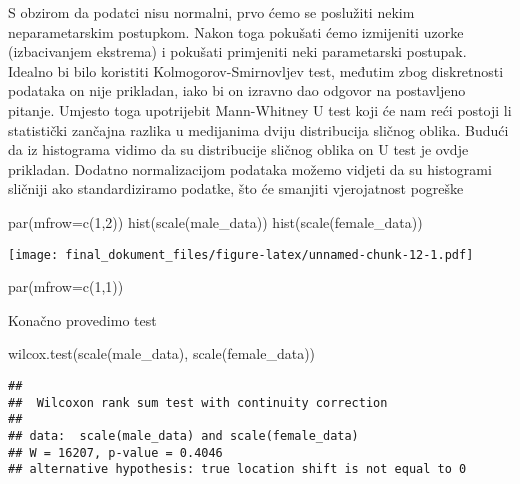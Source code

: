 \documentclass[
]{article}
\newenvironment{Shaded}{\begin{snugshade}}{\end{snugshade}}
\newcommand{\AttributeTok}[1]{\textcolor[rgb]{0.77,0.63,0.00}{#1}}
\newcommand{\DecValTok}[1]{\textcolor[rgb]{0.00,0.00,0.81}{#1}}
\newcommand{\FunctionTok}[1]{\textcolor[rgb]{0.00,0.00,0.00}{#1}}
\newcommand{\NormalTok}[1]{#1}
\begin{document}
S obzirom da podatci nisu normalni, prvo ćemo se poslužiti nekim
neparametarskim postupkom. Nakon toga pokušati ćemo izmijeniti uzorke
(izbacivanjem ekstrema) i pokušati primjeniti neki parametarski
postupak. Idealno bi bilo koristiti Kolmogorov-Smirnovljev test, međutim
zbog diskretnosti podataka on nije prikladan, iako bi on izravno dao
odgovor na postavljeno pitanje. Umjesto toga upotrijebit Mann-Whitney U
test koji će nam reći postoji li statistički zančajna razlika u
medijanima dviju distribucija sličnog oblika. Budući da iz histograma
vidimo da su distribucije sličnog oblika on U test je ovdje prikladan.
Dodatno normalizacijom podataka možemo vidjeti da su histogrami sličniji
ako standardiziramo podatke, što će smanjiti vjerojatnost pogreške

\begin{Shaded}
\begin{Highlighting}[]
\FunctionTok{par}\NormalTok{(}\AttributeTok{mfrow=}\FunctionTok{c}\NormalTok{(}\DecValTok{1}\NormalTok{,}\DecValTok{2}\NormalTok{))}
\FunctionTok{hist}\NormalTok{(}\FunctionTok{scale}\NormalTok{(male\_data))}
\FunctionTok{hist}\NormalTok{(}\FunctionTok{scale}\NormalTok{(female\_data))}
\end{Highlighting}
\end{Shaded}

\texttt{[image: final\_dokument\_files/figure-latex/unnamed-chunk-12-1.pdf]}

\begin{Shaded}
\begin{Highlighting}[]
\FunctionTok{par}\NormalTok{(}\AttributeTok{mfrow=}\FunctionTok{c}\NormalTok{(}\DecValTok{1}\NormalTok{,}\DecValTok{1}\NormalTok{))}
\end{Highlighting}
\end{Shaded}

Konačno provedimo test

\begin{Shaded}
\begin{Highlighting}[]
\FunctionTok{wilcox.test}\NormalTok{(}\FunctionTok{scale}\NormalTok{(male\_data), }\FunctionTok{scale}\NormalTok{(female\_data))}
\end{Highlighting}
\end{Shaded}

\begin{verbatim}
## 
##  Wilcoxon rank sum test with continuity correction
## 
## data:  scale(male_data) and scale(female_data)
## W = 16207, p-value = 0.4046
## alternative hypothesis: true location shift is not equal to 0
\end{verbatim}
\end{document}
